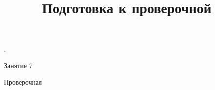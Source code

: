\begin{homework}[number=3]
	\begin{listofex}
		\item .
	\end{listofex}
\end{homework}

\begin{class}[number=7]
	\title{Подготовка к проверочной}
	\begin{listofex}
		\item Занятие 7
	\end{listofex}
\end{class}

\begin{exam}
	\begin{listofex}
		\item Проверочная
	\end{listofex}
\end{exam}

